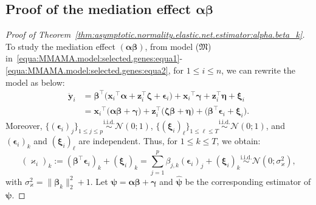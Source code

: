 \documentclass[
  12pt]{article}
\def\X{\mathbf{x}}
\def\Z{\mathbf{z}}
\begin{document}
\subsection{Proof of the mediation effect \texorpdfstring{$\bm{\alpha}\bm{\beta}$}{alpha beta}}
\label{sup:alpha_beta}
\label{sec:proof:thm:asymptotic.normality.elastic.net.estimator:alpha.beta_k}
\begin{proof}[Proof of Theorem~\ref{thm:asymptotic.normality.elastic.net.estimator:alpha.beta_k}]
	To study the mediation effect $(\bm{\alpha}\bm{\beta})$,  from model ($\mathfrak{M}$) in~\eqref{equa:MMAMA.model:selected.genes:equa1}-\eqref{equa:MMAMA.model:selected.genes:equa2}, for $1 \leq i \leq n$, we can rewrite the model as below:     
	\begin{align}
		\ddot{\mathbf{y}}_{i}  &=  \bm{\beta}^{\top} \Big(  { \X_{i} }^{\top}\bm{\alpha}  + \Z_{i}^{\top}  \bm{\zeta}  +  \bm{\epsilon}_{i}  \Big)  +  { \X_{i} }^{\top}  \bm{\gamma}  +     \Z_{i}^{\top} \bm{\eta} +  \bm{\xi}_{i} 
		\nonumber    
		\\
		&=    { \X_{i} } ^{\top}\Big( \bm{\alpha}   \bm{\beta}   +  \bm{\gamma} \Big) 
		+   \Z_{i}^{\top}\Big( \bm{\zeta}  \bm{\beta}  +  \bm{\eta} \Big)   +  \Big( \bm{\beta}^{\top} \bm{\epsilon}_{i}  +  \bm{\xi}_{i}  \Big).
	\end{align}
	Moreover, $\big \{ ( \bm{\epsilon}_{i} )_{j} \big \}_{1 \leq  j \leq p}  \overset{\textrm{i.i.d.}}{\sim} \mathcal{N}(0 ; 1) $, $\big \{ ( \bm{\xi}_{i} )_{\ell} \big \}_{1 \leq  \ell \leq T}    \overset{\textrm{i.i.d.}}{\sim} \mathcal{N}(0 ; 1) $, and $( \bm{\epsilon}_{i} )_{k}$ and $( \bm{\xi}_{i} )_{\ell}$ are independent. Thus, for $1 \leq k \leq T$, we obtain:     
	\[ 
	(\varkappa_{i})_{k} := ( \bm{\beta}^{\top} \bm{\epsilon}_{i})_{k}  +  (\bm{\xi}_{i})_{k}   =  \sum_{j=1}^{p} {\beta}_{j, k}  ( \bm{\epsilon}_{i} )_{j}  +  (\bm{\xi}_{i})_{k}  
	\overset{\textrm{i.i.d.}}{\sim} \mathcal{N}(0 ;  \sigma_{\varkappa}^{2})  , 
	\]
	with $\sigma_{\varkappa}^{2} =  \big\| \bm{\beta}_{k} \big\|_{2}^{2} + 1$.  
	Let $\bm{\psi} = \bm{\alpha}  \bm{\beta} +  \bm{\gamma}$ and $\widehat{\bm{\psi}}$ be the corresponding estimator of $\bm{\psi}$. 
	
	\medskip 
	

\end{proof}
\end{document}
